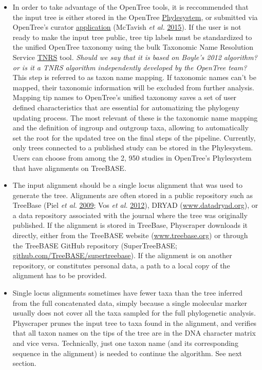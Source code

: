 \documentclass[]{article}
\begin{document}
\begin{itemize}
\item
  In order to take advantage of the OpenTree tools, it is reccommended that the input tree is either stored in the
  OpenTree \href{https://github.com/opentreeoflife/phylesystem}{Phylesystem}, or submitted via OpenTree's curator \href{https://tree.opentreeoflife.org/curator}{application} (McTavish \emph{et al.} \protect\hyperlink{ref-mctavish2015phylesystem}{2015}). If the user is not ready to make the input tree public, tree tip labels must be standardized to the unified OpenTree taxonomy using the bulk Taxonomic Name Resolution Service \href{https://tree.opentreeoflife.org/curator/tnrs/}{TNRS} tool. \emph{Should we say that it is based on Boyle's 2012 algorithm? or is it a TNRS algorithm independently developed by the OpenTree team?}
  This step is referred to as taxon name mapping. If taxonomic names can't be mapped, their taxonomic information will be excluded from further analysis.
  Mapping tip names to OpenTree's unified taxonomy saves a set of user defined characteristics
  that are essential for automatizing the phylogeny updating process. The most relevant of these is the taxonomic name mapping and the definition of ingroup and outgroup taxa, allowing to automatically set the root for the updated tree on the final steps of the pipeline. Currently, only trees connected to a published study can be stored in the Phylesystem.
  Users can choose from among the 2, 950 studies in OpenTree's Phylesystem that have alignments on
  TreeBASE.
\item
  The input alignment should be a single locus alignment that was used to generate the tree. Alignments are often stored in a public repository such as TreeBase (Piel \emph{et al.} \protect\hyperlink{ref-piel2009treebase}{2009}; Vos \emph{et al.} \protect\hyperlink{ref-vos2012nexml}{2012}),
  DRYAD (\href{http://datadryad.org/}{www.datadryad.org}), or a data repository associated with the journal where the tree was originally published.
  If the alignment is stored in TreeBase, Physcraper downloads it directly,
  either from the TreeBASE website (\href{https://treebase.org/}{www.treebase.org})
  or through the TreeBASE GitHub repository (SuperTreeBASE; \href{https://github.com/TreeBASE/supertreebase}{github.com/TreeBASE/supertreebase}).
  If the alignment is on another repository, or constitutes personal data, a path to a local copy of the alignment has to be provided.
\item
  Single locus alignments sometimes have fewer taxa than the tree inferred from the full concatenated data, simply because a single molecular marker usually does not cover all the taxa sampled for the full phylogenetic analysis. Physcraper prunes the input tree to taxa found in the alignment, and verifies that all taxon names on the tips of the tree are in the DNA character matrix and vice versa. Technically, just one taxon name (and its corresponding sequence in the alignment) is needed to continue the algorithm. See next section.

\end{itemize}
\end{document}
